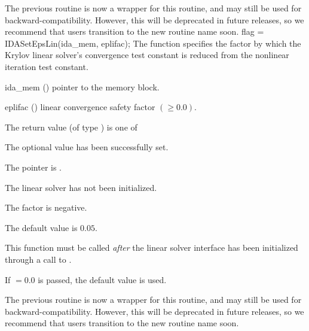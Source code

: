{{  The previous routine  is now a wrapper
  for this routine, and may still be used for backward-compatibility.
  However, this will be deprecated in future releases, so we recommend
  that users transition to the new routine name soon.
}
{
  flag = IDASetEpsLin(ida\_mem, eplifac);
}
{
  The function  specifies the factor by
  which the Krylov linear solver's convergence test constant is
  reduced from the nonlinear iteration test constant.
}
{
  \begin{args}
  \item[ida\_mem] ()
    pointer to the {\idas} memory block.
  \item[eplifac] () linear convergence safety factor $(
    \geq 0.0)$.

  \end{args}
}
{
  The return value  (of type ) is one of
  \begin{args}
  \item[\Id{IDALS\_SUCCESS}]
    The optional value has been successfully set.
  \item[\Id{IDALS\_MEM\_NULL}]
    The  pointer is .
  \item[\Id{IDALS\_LMEM\_NULL}]
    The {\idals} linear solver has not been initialized.
  \item[\Id{IDALS\_ILL\_INPUT}]
    The factor  is negative.
  \end{args}
}
{
  The default value is $0.05$.

  This function must be called \emph{after} the {\idals} linear solver
  interface has been initialized through a call to
  .

  If $ = 0.0$ is passed, the default value is used.

  The previous routine  is now a wrapper for this
  routine, and may still be used for backward-compatibility.  However,
  this will be deprecated in future releases, so we recommend that
  users transition to the new routine name soon.
}
}

